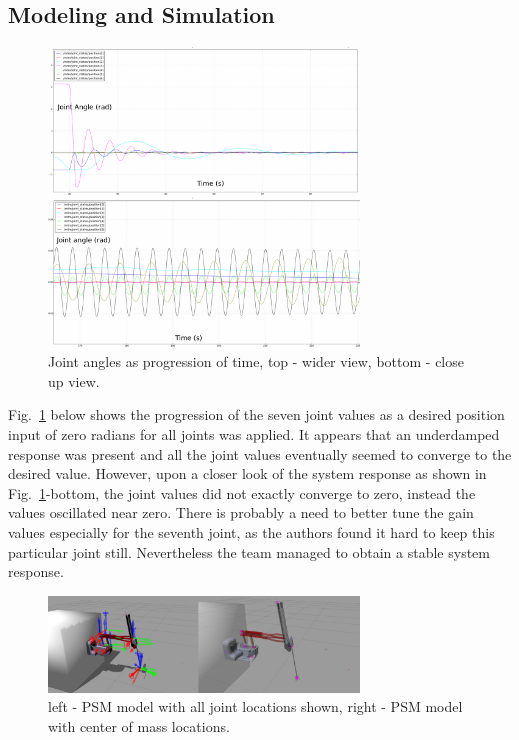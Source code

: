 \documentclass[conference]{IEEEtran}
\begin{document}
\subsection{Modeling and Simulation}

\begin{figure}[!b]
\centering
\includegraphics[width=3.25in]{mtm_result}
\caption{Joint angles as progression of time, top - wider view, bottom - close up view.}
\label{mtm_result}
\end{figure}

Fig.~\ref{mtm_result}  below shows the progression of the seven joint values as a desired position input of zero radians for all joints was applied. It appears that an underdamped response was present and all the joint values eventually seemed to converge to the desired value. However, upon a closer look of the system response as shown in Fig.~\ref{mtm_result}-bottom, the joint values did not exactly converge to zero, instead the values oscillated near zero. There is probably a need to better tune the gain values especially for the seventh joint, as the authors found it hard to keep this particular joint still. Nevertheless the team managed to obtain a stable system response.

\begin{figure}[!t]
\centering
\includegraphics[width=3.25in]{psm_result}
\caption{left - PSM model with all joint locations shown, right - PSM model with center of mass locations.}
\label{psm_result}
\end{figure}
\end{document}
